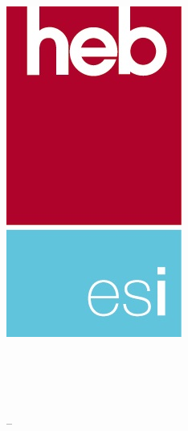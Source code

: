 
\thispagestyle{empty}

\includegraphics[scale=0.2]{image/esi-logo}
\quad
\begin{minipage}[t]{7cm}
	\vspace{-7\baselineskip}
	\sffamily\large
	\textbf{\ecole\\\entite\\\etude}
	\bigskip\\
	\entiteadresse\\\entitetel{} – \entitemail
\end{minipage}

\vfill
\begin{center}
	\sffamily
	\LARGE\ue\\
	\Huge\cours
	\bigskip\\
	\Large\annee
\end{center}
\vfill

\begin{center}
	\Large\auteur
\end{center}
